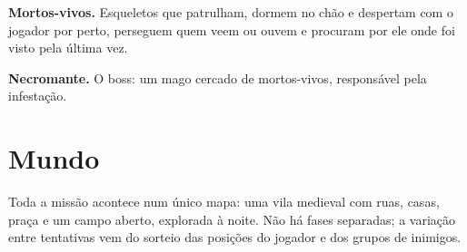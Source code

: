 \documentclass[11pt,a4paper]{article}
\begin{document}
\textbf{Mortos-vivos.} Esqueletos que patrulham, dormem no chão e despertam com o jogador por perto, perseguem quem veem ou ouvem e procuram por ele onde foi visto pela última vez.

\textbf{Necromante.} O boss: um mago cercado de mortos-vivos, responsável pela infestação.

\section{Mundo}

Toda a missão acontece num único mapa: uma vila medieval com ruas, casas, praça e um campo aberto, explorada à noite. Não há fases separadas; a variação entre tentativas vem do sorteio das posições do jogador e dos grupos de inimigos.
\end{document}
